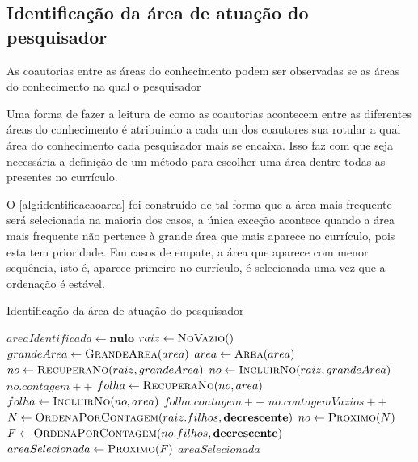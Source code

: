 \subsection{Identificação da área de atuação do pesquisador}

As coautorias entre as áreas do conhecimento podem ser observadas se as áreas do conhecimento na qual o pesquisador 

Uma forma de fazer a leitura de como as coautorias acontecem entre as diferentes áreas do conhecimento é atribuindo a cada um dos coautores sua  rotular a qual área do conhecimento cada pesquisador mais se encaixa. Isso faz com que seja necessária a definição de um método para escolher uma área dentre todas as presentes no currículo.

O \autoref{alg:identificacaoarea} foi construído de tal forma que a área mais frequente será selecionada na maioria dos casos, a única exceção acontece quando a área mais frequente não pertence à grande área que mais aparece no currículo, pois esta tem prioridade. Em casos de empate, a área que aparece com menor sequência, isto é, aparece primeiro no currículo, é selecionada uma vez que a ordenação é estável.

\begin{algorithm}
  \caption{Identificação da área de atuação do pesquisador}
  \label{alg:identificacaoarea}
  \begin{algorithmic}[1]
    \State $areaIdentificada\gets \textbf{nulo}$
    \State $raiz\gets \Call{NoVazio}$
        \State $grandeArea\gets \Call{GrandeArea}{area}$
        \State $area\gets \Call{Area}{area}$
        \State $no\gets \Call{RecuperaNo}{raiz, grandeArea}$
            \State $no\gets \Call{IncluirNo}{raiz, grandeArea}$
        \EndIf
        \State $no.contagem++$
            \State $folha\gets \Call{RecuperaNo}{no, area}$
                \State $folha\gets \Call{IncluirNo}{no, area}$
            \EndIf
            \State $folha.contagem++$
        \Else
            \State $no.contagemVazios++$
        \EndIf
    \EndFor
    \State $N\gets \Call{OrdenaPorContagem}{raiz.filhos, \textbf{decrescente}}$
        \State $no\gets \Call{Proximo}{N}$
            \State $F\gets \Call{OrdenaPorContagem}{no.filhos, \textbf{decrescente}}$
            \State $areaSelecionada\gets \Call{Proximo}{F}$
        \EndIf
    \EndWhile
    \State \Return $areaSelecionada$
  \EndProcedure
  \end{algorithmic}
\end{algorithm}

